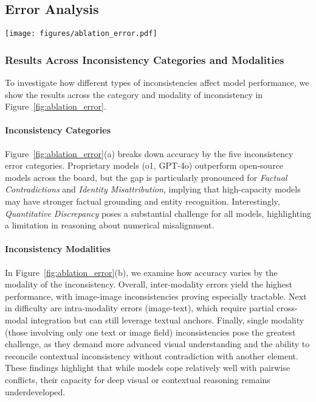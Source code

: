 \subsection{Error Analysis}



\begin{figure*}[h]
\setlength\tabcolsep{0pt}
\setlength{\abovecaptionskip}{0.1cm}
    \centering
    \texttt{[image: figures/ablation\_error.pdf]}
    \caption{Fine-grained analysis of model performance.}
    \label{fig:ablation_error}
\end{figure*}

\subsubsection{Results Across Inconsistency Categories and Modalities}
To investigate how different types of inconsistencies affect model performance, we show the results across the category and modality of inconsistency in Figure~\ref{fig:ablation_error}. 

\paragraph{Inconsistency Categories}
Figure~\ref{fig:ablation_error}(a) breaks down accuracy by the five inconsistency error categories. Proprietary models (o1, GPT-4o) outperform open-source models across the board, but the gap is particularly pronounced for \emph{Factual Contradictions} and \emph{Identity Misattribution}, implying that high-capacity models may have stronger factual grounding and entity recognition. 
Interestingly, \emph{Quantitative Discrepancy} poses a substantial challenge for all models, highlighting a limitation in reasoning about numerical misalignment.

\paragraph{Inconsistency Modalities}
In Figure~\ref{fig:ablation_error}(b), we examine how accuracy varies by the modality of the inconsistency. Overall, inter-modality errors yield the highest performance, with image-image inconsistencies proving especially tractable. 
Next in difficulty are intra-modality errors (image-text), which require partial cross-modal integration but can still leverage textual anchors. 
Finally, single modality (those involving only one text or image field) inconsistencies pose the greatest challenge, as they demand more advanced visual understanding and the ability to reconcile contextual inconsistency without contradiction with another element.
These findings highlight that while models cope relatively well with pairwise conflicts, their capacity for deep visual or contextual reasoning remains underdeveloped.

